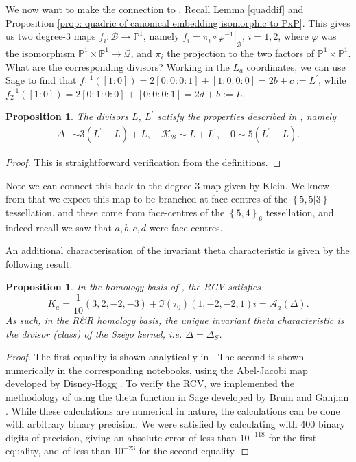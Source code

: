 \documentclass{amsart}
\newtheorem{prop}[theorem]{Proposition}
\newcommand{\pbrace}[1]{\left\{ #1 \right\} }
\begin{document}
We now want to make the connection to \cite{Burns1983}. Recall Lemma \ref{quaddif} and Proposition \ref{prop: quadric of canonical embedding isomorphic to PxP}. This gives us two degree-3 maps $f_i : \mathcal{B} \to \mathbb{P}^1$, namely $f_i = \left. \pi_i \circ \varphi^{-1}\right\rvert_{\mathcal{B}} $, $i=1,2$, where $\varphi$ was the isomorphism $\mathbb{P}^1 \times \mathbb{P}^1 \to \mathcal{Q}$, and $\pi_i$ the projection to the two factors of $\mathbb{P}^1 \times \mathbb{P}^1$. What are the corresponding divisors? Working in the $L_a$ coordinates, we can use Sage to find that $f_1^{-1}([1:0]) = 2[0:0:0:1]+[1:0:0:0] = 2b+c := L^\prime$, while $f_2^{-1}([1:0]) = 2[0:1:0:0]+[0:0:0:1]= 2d+b := L$.
\begin{prop}\label{burnsLs}
The divisors $L$, $L^\prime$ satisfy the properties described in \cite{Burns1983}, namely 
\begin{align*}
    \Delta &\sim 3(L^\prime -L) + L, \quad 
    \mathcal{K}_\mathcal{B} \sim L+L^\prime, \quad  
    0 \sim 5(L^\prime - L)  . 
\end{align*}
\end{prop}
\begin{proof}
This is straightforward verification from the definitions. 
\end{proof}
Note we can connect this back to the degree-3 map given by Klein. We know from \cite{Weber2005} that we expect this map to be branched at face-centres of the $\pbrace{5, 5  |  3}$ tessellation, and these come from face-centres of the $\pbrace{5,4}_6$ tessellation, and indeed recall we saw that $a,b,c,d$ were face-centres. 

An additional characterisation of the invariant theta characteristic is given by the following result. 
\begin{prop}\label{szegoinvt}
In the homology basis of \cite{Riera1992}, the RCV satisfies \[
K_a = \frac{1}{10}(
3 , 2 , -2 , -3
) + \Im(\tau_0)(
1 , -2 , -2 , 1
)i  = \mathcal{A}_a(\Delta) . 
\]
As such, in the R\&R homology basis, the unique invariant theta characteristic is the divisor (class) of the Sz\"ego kernel, i.e. $\Delta = \Delta_S$. 
\end{prop}
\begin{proof}
The first equality is shown analytically in \cite{Braden2012}. The second is shown numerically in the corresponding notebooks, using the Abel-Jacobi map developed by Disney-Hogg \cite{DisneyHogg2021}. To verify the RCV, we implemented the methodology of \cite{Deconinck2015} using the theta function in Sage developed by Bruin and Ganjian \cite{Bruin2021}. While these calculations are numerical in nature, the calculations can be done with arbitrary binary precision. We were satisfied by calculating with 400 binary digits of precision, giving an absolute error of less than $10^{-118}$ for the first equality, and of less than $10^{-23}$ for the second equality.  
\end{proof}
\end{document}
